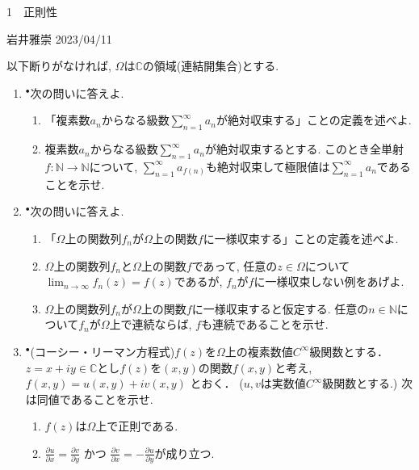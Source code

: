 \documentclass[dvipdfmx,a4paper,11pt]{article}
\newcommand{\N}{\mathbb{N}}
\newcommand{\C}{\mathbb{C}}
\theoremstyle{definition}
\newcommand{\pdrv}[2]{\frac{\partial #1}{\partial #2}}
\begin{document}

\begin{center}
{\Large 1　正則性}
\end{center}

\begin{flushright}
 岩井雅崇 2023/04/11
\end{flushright}
以下断りがなければ, $\Omega$は$\C$の領域(連結開集合)とする.

\begin{enumerate}[label=\textbf{問}1.\arabic*]

\item$^{\bullet}$次の問いに答えよ.
\begin{enumerate}
    \setlength{\parskip}{0cm} 
  \setlength{\itemsep}{0cm} 
  \item 「複素数$a_n$からなる級数$\sum_{n=1}^{\infty} a_n$が絶対収束する」ことの定義を述べよ.
  \item 複素数$a_n$からなる級数$\sum_{n=1}^{\infty}  a_n$が絶対収束するとする. このとき全単射$f : \N \rightarrow \N$について, $\sum_{n=1}^{\infty}  a_{f(n)} $も絶対収束して極限値は$\sum_{n=1}^{\infty}  a_n$であることを示せ.
\end{enumerate}

\item$^{\bullet}$次の問いに答えよ.
\begin{enumerate}
\setlength{\parskip}{0cm} 
  \setlength{\itemsep}{0cm} 
  \item 「$\Omega$上の関数列$f_{n}$が$\Omega$上の関数$f$に一様収束する」ことの定義を述べよ. 
  \item $\Omega$上の関数列$f_{n}$と$\Omega$上の関数$f$であって, 任意の$z \in \Omega$について$\lim_{n \rightarrow \infty} f_n(z) =f(z)$であるが, $f_{n}$が$f$に一様収束しない例をあげよ. 
  \item $\Omega$上の関数列$f_{n}$が$\Omega$上の関数$f$に一様収束すると仮定する. 任意の$n \in \N$について$f_{n}$が$\Omega$上で連続ならば, $f$も連続であることを示せ.
      \end{enumerate}


\item $^{\bullet}$(コーシー・リーマン方程式)$f(z)$を$\Omega$上の複素数値$C^{\infty}$級関数とする．
$z = x + iy \in \C$とし$f(z)$を$(x,y)$の関数$f(x,y)$と考え, 
$
f(x,y) = u(x,y) + i v(x,y)
$
とおく． ($u,v$は実数値$C^{\infty}$級関数とする.)
次は同値であることを示せ.
\begin{enumerate}
    \setlength{\parskip}{0cm} 
  \setlength{\itemsep}{0cm} 
  \item $f(z)$は$\Omega$上で正則である.
  \item $\pdrv{u}{x} = \pdrv{v}{y}$ かつ $\pdrv{v}{x} = - \pdrv{u}{y}$が成り立つ.
\end{enumerate}



\end{enumerate}
\end{document}
